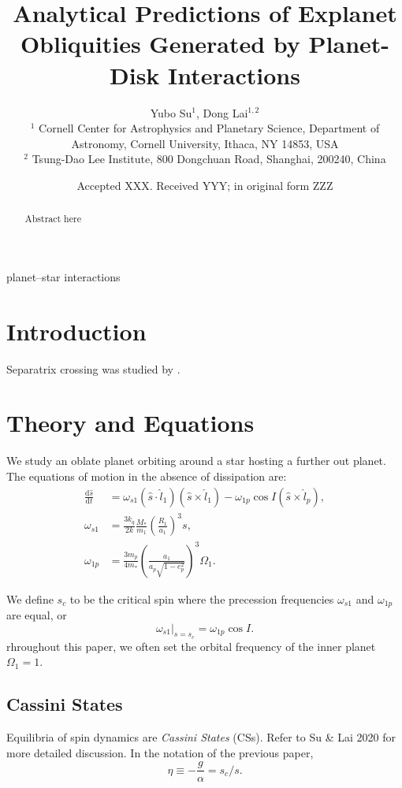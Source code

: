 \documentclass[
        fleqn,
        usenatbib,
        referee,
    ]{mnras}
\title[Analytical Exoplanet Obliquities]{Analytical Predictions of Explanet
Obliquities Generated by Planet-Disk Interactions}
\author[Y. Su and D. Lai]{
Yubo Su$^1$,
Dong Lai$^{1,2}$
\\
$^1$ Cornell Center for Astrophysics and Planetary Science, Department of
Astronomy, Cornell University, Ithaca, NY 14853, USA
\\
$^2$ Tsung-Dao Lee Institute, 800 Dongchuan Road, Shanghai, 200240, China
}
\date{Accepted XXX\@. Received YYY\@; in original form ZZZ}
\newcommand*{\rd}[2]{\frac{\mathrm{d}#1}{\mathrm{d}#2}}
\newcommand*{\at}[1]{\left.#1\right|}
\newcommand*{\p}[1]{\left(#1\right)}
\begin{document}
\label{firstpage}
\pagerange{\pageref{firstpage}--\pageref{lastpage}}
\maketitle

\begin{abstract}
    Abstract here
\end{abstract}

\begin{keywords}
planet--star interactions %
\end{keywords}

\section{Introduction}

Separatrix crossing was studied by \citep{henrard1982}.

\section{Theory and Equations}\label{s:theory}

We study an oblate planet orbiting around a star hosting a further out planet.
The equations of motion in the absence of dissipation are:
\begin{align}
    \rd{\hat{s}}{t}
        &= \omega_{s1}\p{\hat{s} \cdot \hat{l}_1}\p{\hat{s} \times \hat{l}_1}
            - \omega_{1p}\cos I\p{\hat{s} \times \hat{l}_p},\\
    \omega_{s1} &= \frac{3k_q}{2k}\frac{M_*}{m_1}\p{\frac{R_1}{a_1}}^3 s,\\
    \omega_{1p} &= \frac{3m_p}{4m_*}\p{\frac{a_1}{a_p\sqrt{1 - e_p^2}}}^3 \Omega_1.
\end{align}

We define $s_c$ to be the critical spin where the precession frequencies
$\omega_{s1}$ and $\omega_{1p}$ are equal, or
\begin{equation}
    \at{\omega_{s1}}_{s = s_c} = \omega_{1p}\cos I.
\end{equation}
rhroughout this paper, we often set the orbital frequency of the inner planet
$\Omega_1 = 1$.

\subsection{Cassini States}\label{ss:cs_theory}

Equilibria of spin dynamics are \emph{Cassini States} (CSs). Refer to Su \& Lai
2020 for more detailed discussion. In the notation of the previous paper,
\begin{equation}
    \eta \equiv -\frac{g}{\alpha} = s_c / s.
\end{equation}
\end{document}
